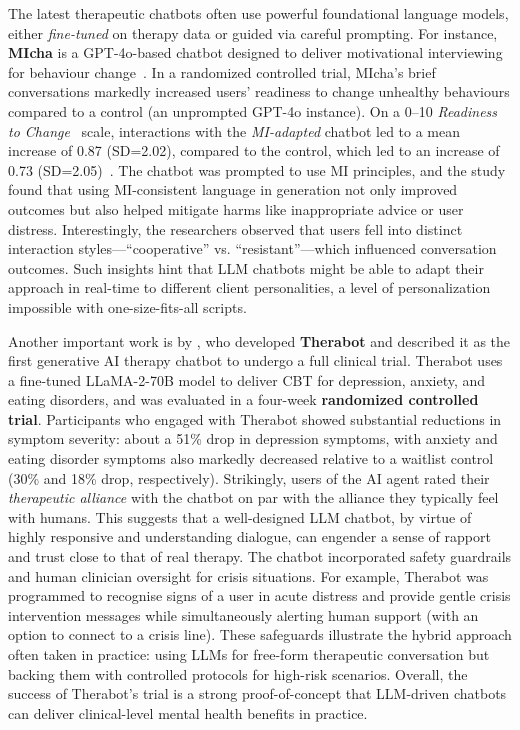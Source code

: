 The latest therapeutic chatbots often use powerful foundational language models, either \emph{fine-tuned} on therapy data or guided via careful prompting. For instance, \textbf{MIcha} is a GPT-4o-based chatbot designed to deliver motivational interviewing for behaviour change~\cite{Meyer2025}. In a randomized controlled trial, MIcha's brief conversations markedly increased users' readiness to change unhealthy behaviours compared to a control (an unprompted GPT-4o instance). On a 0--10 \emph{Readiness to Change}~\cite{BienerAbrams1991} scale, interactions with the \emph{MI-adapted} chatbot led to a mean increase of 0.87 (SD=2.02), compared to the control, which led to an increase of 0.73 (SD=2.05)~\cite{Meyer2025}.
The chatbot was prompted to use MI principles, and the study found that using MI-consistent language in generation not only improved outcomes but also helped mitigate harms like inappropriate advice or user distress. Interestingly, the researchers observed that users fell into distinct interaction styles---``cooperative'' vs. ``resistant''---which influenced conversation outcomes. Such insights hint that LLM chatbots might be able to adapt their approach in real-time to different client personalities, a level of personalization impossible with one-size-fits-all scripts.

Another important work is by \citet{doi:10.1056/AIoa2400802}, who developed \textbf{Therabot} and described it as the first generative AI therapy chatbot to undergo a full clinical trial. Therabot uses a fine-tuned LLaMA-2-70B model to deliver CBT for depression, anxiety, and eating disorders, and was evaluated in a four-week \textbf{randomized controlled trial}. Participants who engaged with Therabot showed substantial reductions in symptom severity: about a 51\% drop in depression symptoms, with anxiety and eating disorder symptoms also markedly decreased relative to a waitlist control (30\% and 18\% drop, respectively). Strikingly, users of the AI agent rated their \emph{therapeutic alliance} with the chatbot on par with the alliance they typically feel with humans. This suggests that a well-designed LLM chatbot, by virtue of highly responsive and understanding dialogue, can engender a sense of rapport and trust close to that of real therapy. The chatbot incorporated safety guardrails and human clinician oversight for crisis situations. For example, Therabot was programmed to recognise signs of a user in acute distress and provide gentle crisis intervention messages while simultaneously alerting human support (with an option to connect to a crisis line). These safeguards illustrate the hybrid approach often taken in practice: using LLMs for free-form therapeutic conversation but backing them with controlled protocols for high-risk scenarios. Overall, the success of Therabot's trial is a strong proof-of-concept that LLM-driven chatbots can deliver clinical-level mental health benefits in practice.

